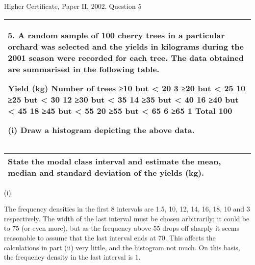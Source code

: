 \documentclass[a4paper,12pt]{article}
\begin{document}
Higher Certificate, Paper II, 2002.  Question 5 
\begin{table}[ht!]
 
\centering
 
\begin{tabular}{|p{15cm}|}
 
\hline  

 
5. A random sample of 100 cherry trees in a particular orchard was selected and the yields in kilograms during the 2001 season were recorded for each tree.  
The data obtained are summarised in the following table. 
 
 
Yield (kg) Number of trees ≥10 but < 20     3 ≥20 but < 25   10 ≥25 but < 30   12 ≥30 but < 35   14 ≥35 but < 40   16 ≥40 but < 45   18 ≥45 but < 55   20 ≥55 but < 65     6 ≥65     1 Total 100 
 
 
(i) Draw a histogram depicting the above data. 
\\ \hline
  
\end{tabular}

\end{table}

\begin{table}[ht!]
 
\centering
 
\begin{tabular}{|p{15cm}|}
 
\hline  
 
State the modal class interval and estimate the mean, median and standard deviation of the yields (kg). 

 
\\ \hline
  
\end{tabular}

\end{table} 
 
(i) 
 
The frequency densities in the first 8 intervals are 1.5, 10, 12, 14, 16, 18, 10 and 3 respectively.  The width of the last interval must be chosen arbitrarily;  it could be to 75 (or even more), but as the frequency above 55 drops off sharply it seems reasonable to assume that the last interval ends at 70.  This affects the calculations in part (ii) very little, and the histogram not much.  On this basis, the frequency density in the last interval is 1. 
 
\end{document}
